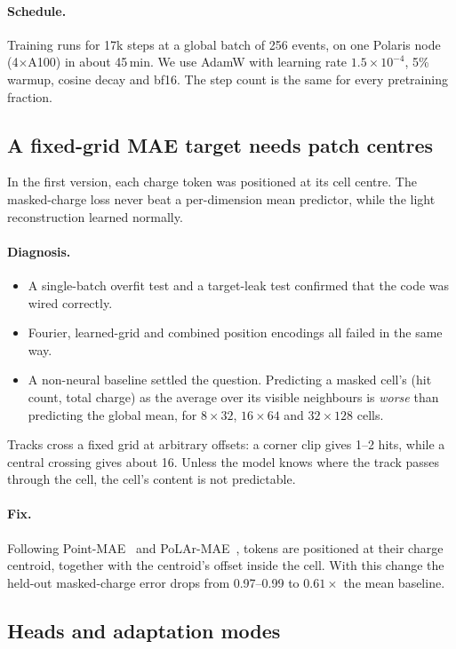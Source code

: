 \documentclass[11pt,a4paper]{article}
\begin{document}
\paragraph{Schedule.} Training runs for 17k steps at a global batch of 256 events, on one Polaris node (4$\times$A100) in about 45\,min. We use AdamW with learning rate $1.5\times10^{-4}$, 5\% warmup, cosine decay and bf16. The step count is the same for every pretraining fraction.

\subsection{A fixed-grid MAE target needs patch centres}\label{sec:centroid}
In the first version, each charge token was positioned at its cell centre. The masked-charge loss never beat a per-dimension mean predictor, while the light reconstruction learned normally.

\paragraph{Diagnosis.}
\begin{itemize}
  \item A single-batch overfit test and a target-leak test confirmed that the code was wired correctly.
  \item Fourier, learned-grid and combined position encodings all failed in the same way.
  \item A non-neural baseline settled the question. Predicting a masked cell's (hit count, total charge) as the average over its visible neighbours is \emph{worse} than predicting the global mean, for $8\times32$, $16\times64$ and $32\times128$ cells.
\end{itemize}
Tracks cross a fixed grid at arbitrary offsets: a corner clip gives 1--2 hits, while a central crossing gives about 16. Unless the model knows where the track passes through the cell, the cell's content is not predictable.

\paragraph{Fix.} Following Point-MAE~\cite{pointmae} and PoLAr-MAE~\cite{polarmae}, tokens are positioned at their charge centroid, together with the centroid's offset inside the cell. With this change the held-out masked-charge error drops from 0.97--0.99 to $0.61\times$ the mean baseline.

\subsection{Heads and adaptation modes}
\end{document}
